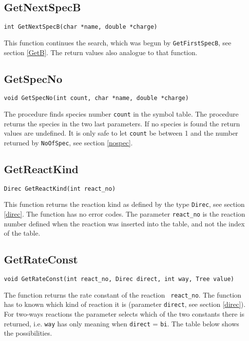 \subsection{GetNextSpecB}
\begin{verbatim}
int GetNextSpecB(char *name, double *charge)
\end{verbatim}

This function continues the search, which was begun by 
{\tt GetFirstSpecB}, see section \ref{GetB}.
The return values also analogue to that function.

\subsection{GetSpecNo}
\begin{verbatim}
void GetSpecNo(int count, char *name, double *charge)
\end{verbatim}

The procedure finds species number {\tt count} in the symbol table. 
The procedure returns the species in the two last parameters. 
If no species is found the return values are undefined.
It is only safe to let {\tt count} be between 1 and the number
returned by {\tt NoOfSpec}, see section \ref{nospec}.

\subsection{GetReactKind}
\begin{verbatim}
Direc GetReactKind(int react_no)
\end{verbatim}

This function returns the reaction kind as defined by the type 
{\tt Direc}, see section \ref{direc}.
The function has no error codes. The parameter {\tt react{\_}no} is the 
reaction number defined when the reaction was inserted into the table,
and not the index of the table.

\subsection{GetRateConst}
\begin{verbatim}
void GetRateConst(int react_no, Direc direct, int way, Tree value)
\end{verbatim}

The function returns the rate constant of the reaction {\tt
  react\_no}. 
The function has to known which kind of reaction it is (parameter 
{\tt direct}, see section \ref{direc}). 
For two-ways reactions the parameter selects which of the two
constants there is returned, i.e.
{\tt way} has only meaning when {\tt direct} = {\tt bi}. 
The table below shows the possibilities.

